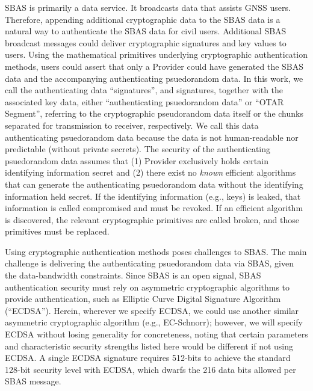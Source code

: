 \documentclass[APA,STIX1COL]{IONjournal/ION-APA Template}
\begin{document}
	SBAS is primarily a data service.
	It broadcasts data that assists GNSS users.
	Therefore, appending additional cryptographic data to the SBAS data is a natural way to authenticate the SBAS data for civil users.
	Additional SBAS broadcast messages could deliver cryptographic signatures and key values to users.
	Using the mathematical primitives underlying cryptographic authentication methods, users could assert that only a Provider could have generated the SBAS data and the accompanying authenticating psuedorandom data.
	In this work, we call the authenticating data ``signatures'', and signatures, together with the associated key data, either ``authenticating psuedorandom data'' or ``OTAR Segment'', referring to the cryptographic pseudorandom data itself or the chunks separated for transmission to receiver, respectively.
	We call this data authenticating psuedorandom data because the data is not human-readable nor predictable (without private secrets).
	The security of the authenticating psuedorandom data assumes that (1) Provider exclusively holds certain identifying information secret and (2) there exist no {\em known} efficient algorithms that can generate the authenticating psuedorandom data without the identifying information held secret.
	If the identifying information (e.g., keys) is leaked, that information is called compromised and must be revoked.
	If an efficient algorithm is discovered, the relevant cryptographic primitives are called broken, and those primitives must be replaced.

	Using cryptographic authentication methods poses challenges to SBAS.
	The main challenge is delivering the authenticating psuedorandom data via SBAS, given the data-bandwidth constraints.
	Since SBAS is an open signal, SBAS authentication security must rely on asymmetric cryptographic algorithms to provide authentication, such as Elliptic Curve Digital Signature Algorithm (``ECDSA'').
	Herein, wherever we specify ECDSA, we could use another similar asymmetric cryptographic algorithm (e.g., EC-Schnorr); however, we will specify ECDSA without losing generality for concreteness, noting that certain parameters and characteristic security strengths listed here would be different if not using ECDSA.
	A single ECDSA signature requires 512-bits to achieve the standard 128-bit security level with ECDSA, which dwarfs the 216 data bits allowed per SBAS message.
\end{document}
